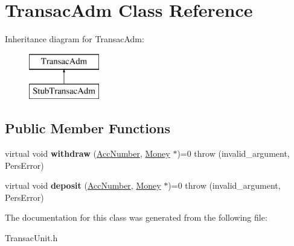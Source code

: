 \hypertarget{classTransacAdm}{\section{Transac\-Adm Class Reference}
\label{da/deb/classTransacAdm}
}
Inheritance diagram for Transac\-Adm\-:\begin{figure}[H]
\begin{center}
\leavevmode
\includegraphics[height=2.000000cm]{da/deb/classTransacAdm}
\end{center}
\end{figure}
\subsection*{Public Member Functions}
\begin{DoxyCompactItemize}
\item 
\hypertarget{classTransacAdm_a128750caeeec2cd48a4a01e6ce9f701c}{virtual void {\bfseries withdraw} (\hyperlink{classAccNumber}{Acc\-Number}, \hyperlink{classMoney}{Money} $\ast$)=0  throw (invalid\-\_\-argument, Pers\-Error)}\label{da/deb/classTransacAdm_a128750caeeec2cd48a4a01e6ce9f701c}

\item 
\hypertarget{classTransacAdm_a9b6ffc8a521600094eb13510edcb33d7}{virtual void {\bfseries deposit} (\hyperlink{classAccNumber}{Acc\-Number}, \hyperlink{classMoney}{Money} $\ast$)=0  throw (invalid\-\_\-argument, Pers\-Error)}\label{da/deb/classTransacAdm_a9b6ffc8a521600094eb13510edcb33d7}

\end{DoxyCompactItemize}


The documentation for this class was generated from the following file\-:\begin{DoxyCompactItemize}
\item 
Transac\-Unit.\-h\end{DoxyCompactItemize}
